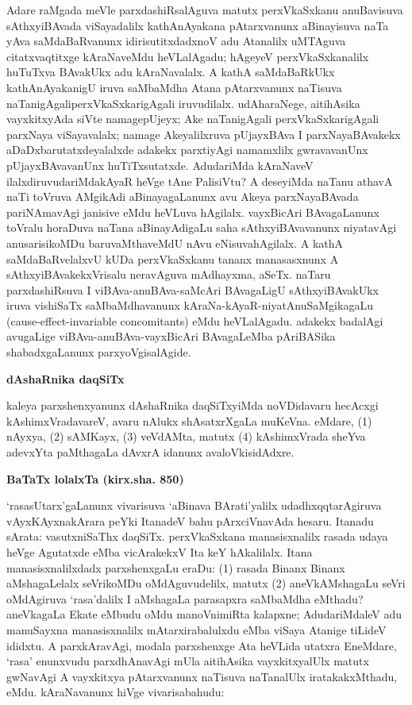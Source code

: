 Adare raMgada meVle parxdashiRsalAguva matutx perxVkaSxkanu anuBavisuva sAthxyi\break\-BAvada viSayadalilx kathAnAyakana pAtarxvanunx aBinayisuva naTa yAva saMdaBaR\-vanunx idirisutitxdadxnoV adu Atanalilx uMTAguva citatxvaqtitxge kAraNaveMdu heVLa\break\-lAgadu; hAgeyeV perxVkaSxkanalilx huTuTxva BAvakUkx adu kAraNavalalx. A kathA saMda\-BaRkUkx kathAnAyakanigU iruva saMbaMdha Atana pAtarxvanunx naTisuva naTanigAgali\break perxVkaSxkarigAgali iruvudilalx. udAharaNege, aitihAsika vayxkitxyAda siVte namage\break pUjeyx; Ake naTanigAgali perxVkaSxkarigAgali parxNaya viSayavalalx; namage Akeyalilxruva pUjayxBAva I parxNayaBAvakekx aDaDxbarutatxdeyalalxde adakekx parxtiyAgi namamxlilx gwrava\break\-vanUnx pUjayxBAvavanUnx huTiTxsutatxde. AdudariMda kAraNaveV ilalxdiruvudariMda\break kAyaR heVge tAne PalisiVtu? A deseyiMda naTanu athavA naTi toVruva AMgikAdi aBinayagaLanunx avu Akeya parxNayaBAvada pariNAmavAgi janisive eMdu heVLuva hAgilalx. vayxBicAri BAvagaLanunx toVralu horaDuva naTana aBinayAdigaLu saha sAthxyiBAvavanunx niyatavAgi anusarisikoMDu baruvaMthaveMdU nAvu eNisuva\break hAgilalx. A kathA saMdaBaRvelalxvU kUDa perxVkaSxkanu tananx manasasxnunx A sAthxyiBAvakekxVri\-salu neravAguva mAdhayxma, aSeTx. naTaru parxdashiRsuva I viBAva-anuBAva-\hbox{saMcAri} BAvagaLigU sAthxyiBAvakUkx iruva vishiSaTx saMbaMdhavanunx kAraNa-kAyaR-niya\-tAnu\-SaMgikagaLu {\rm(cause-effect-invariable concomitants)} eMdu heVLalAgadu. adakekx badalAgi avugaLige viBAva-anuBAva-vayxBicAri BAvagaLeMba pAriBASika shabadxgaLanunx parxyoVgisalAgide.

\bigskip
\begin{center}
{\Large\bf dAshaRnika daqSiTx}
\end{center}

kaleya parxshenxyanunx dAshaRnika daqSiTxyiMda noVDidavaru hecAcxgi kAshimxVradavareV, avaru nAlukx shAsatxrXgaLa muKeVna. eMdare, (1) nAyxya, (2) sAMKayx, (3) veVdAMta, matutx (4) kAshimxVrada sheYva adevxYta paMthagaLa dAvxrA idanunx avaloVkisidAdxre.

\bigskip
\begin{center}
{\Large\bf BaTaTx lolalxTa (kirx.sha. 850)}
\end{center}

`rasasUtarx'gaLanunx vivarisuva `aBinava BArati'yalilx udadhxqqtarAgiruva vAyxKAyxna\-kArara peYki ItanadeV bahu pArxciVnavAda hesaru. Itanadu sArata: vasutxniSaThx daqSiTx. perxVkaSxkana manasisxnalilx rasada udaya heVge Agutatxde eMba vicArakekxV Ita keY hAkalilalx. Itana manasisxnalilxdadx parxshenxgaLu eraDu: (1) rasada Binanx Binanx aMshagaLelalx seVrikoMDu oMdAguvudelilx, matutx (2) aneVkAMshagaLu seVri oMdAgiruva `rasa'dalilx I aMshagaLa parasapxra saMbaMdha eMthadu? aneVkagaLa Ekate eMbudu oMdu manoVnimiRta kalapxne; AdudariMdaleV adu manuSayxna manasisxnalilx mAtarx\break irabalulxdu eMba viSaya Atanige tiLideV ididxtu. A parxkAravAgi, modala parxshenxge Ata heVLida utatxra EneMdare, `rasa' enunxvudu parxdhAnavAgi mUla aitihAsika vayxkitxyalUlx matutx gwNavAgi A vayxkitxya pAtarxvanunx naTisuva naTanalUlx iratakakxMthadu, eMdu. kAraNavanunx hiVge vivarisabahudu:

